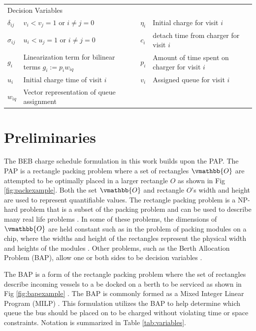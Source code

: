 \documentclass[letterpaper, 10pt, conference]{IEEEtran}
\begin{document}
\begin{table}[!t]
\begin{tabular}{l l l l}
		\hline
		\multicolumn{4}{l}{Decision Variables} \\
			$\delta_{ij}$ & $v_i < v_j = 1$ \textrm{ or } $i \neq j = 0$                    &
			$\eta_i$      & Initial charge for visit $i$                                    \\
			$\sigma_{ij}$ & $u_i < u_j = 1$ \textrm{ or } $i \neq j = 0$                    &
			$c_i$         & detach time from charger for visit $i$                          \\
			$g_i$         & Linearization term for bilinear terms $g_i := p_i w_{iq}$       &
			$p_i$         & Amount of time spent on charger for visit $i$                   \\
			$u_i$         & Initial charge time of visit $i$                                &
			$v_i$         & Assigned queue for visit $i$                                    \\
			$w_{iq}$      & Vector representation of queue assignment                       \\
			\bottomrule
	\end{tabular}
\end{table}

\section{Preliminaries}
\label{sec:preliminaries}
The BEB charge schedule formulation in this work builds upon the PAP. The PAP is a rectangle packing problem where a set of rectangles \(\vmathbb{O}\) are attempted to be optimally placed in a larger rectangle \(O\) as shown in Fig \ref{fig:packexample}. Both the set \(\vmathbb{O}\) and rectangle \(O\)'s width and height are used to represent quantifiable values. The rectangle packing problem is a NP-hard problem that is a subset of the packing problem and can be used to describe many real life problems \cite{Bruin2013,Murata1995}. In some of these problems, the dimensions of \(\vmathbb{O}\) are held constant such as in the problem of packing modules on a chip, where the widths and height of the rectangles represent the physical width and heights of the modules \cite{Murata1995}. Other problems, such as the Berth Allocation Problem (BAP), allow one or both sides to be decision variables \cite{Buhrkal2010}.

The BAP is a form of the rectangle packing problem where the set of rectangles describe incoming vessels to a be docked on a berth to be serviced as shown in Fig \ref{fig:bapexample} \cite{Dai2008}. The BAP is commonly formed as a Mixed Integer Linear Program (MILP) \cite{Frojan2015,Buhrkal2010}. This formulation utilizes the BAP to help determine which queue the bus should be placed on to be charged without violating time or space constraints. Notation is summarized in Table \ref{tab:variables}.
\end{document}
